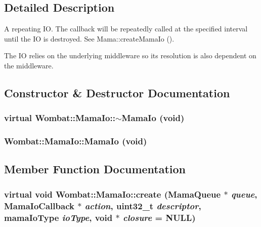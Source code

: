 \subsection{Detailed Description}
A repeating IO. The callback will be repeatedly called at the specified interval until the IO is destroyed. See Mama::createMamaIo ().

The IO relies on the underlying middleware so its resolution is also dependent on the middleware. 

\subsection{Constructor \& Destructor Documentation}
\hypertarget{classWombat_1_1MamaIo_a18619247440895bb19f501a1ae684e2a}{
\subsubsection[{$\sim$MamaIo}]{\setlength{\rightskip}{0pt plus 5cm}virtual Wombat::MamaIo::$\sim$MamaIo (void)}}
\label{classWombat_1_1MamaIo_a18619247440895bb19f501a1ae684e2a}
\hypertarget{classWombat_1_1MamaIo_a2cf2edfb84150714cff618a6c31fb301}{
\subsubsection[{MamaIo}]{\setlength{\rightskip}{0pt plus 5cm}Wombat::MamaIo::MamaIo (void)}}
\label{classWombat_1_1MamaIo_a2cf2edfb84150714cff618a6c31fb301}


\subsection{Member Function Documentation}
\hypertarget{classWombat_1_1MamaIo_a606eb8a0ecf125a55e0a21a2ebe067b7}{
\subsubsection[{create}]{\setlength{\rightskip}{0pt plus 5cm}virtual void Wombat::MamaIo::create ({\bf MamaQueue} $\ast$ {\em queue}, \/  {\bf MamaIoCallback} $\ast$ {\em action}, \/  uint32\_\-t {\em descriptor}, \/  mamaIoType {\em ioType}, \/  void $\ast$ {\em closure} = {\ttfamily NULL})}}
\label{classWombat_1_1MamaIo_a606eb8a0ecf125a55e0a21a2ebe067b7}


